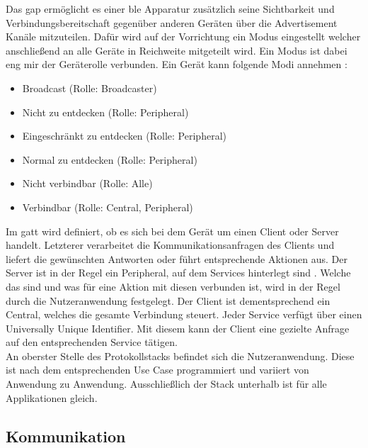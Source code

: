 \noindent Das \ac{gap} ermöglicht es einer \ac{ble} Apparatur zusätzlich seine Sichtbarkeit und Verbindungsbereitschaft gegenüber anderen Geräten über die Advertisement Kanäle mitzuteilen. Dafür wird auf der Vorrichtung ein Modus eingestellt welcher anschließend an alle Geräte in Reichweite mitgeteilt wird. Ein Modus ist dabei eng mir der Geräterolle verbunden. Ein Gerät kann folgende Modi annehmen \cite[Seite 35]{Townsend14:GSB}:
\begin{itemize}
	\setlength{\itemsep}{1pt}
	\item{Broadcast (Rolle: Broadcaster)}
	\item{Nicht zu entdecken (Rolle: Peripheral)}
	\item{Eingeschränkt zu entdecken (Rolle: Peripheral)}
	\item{Normal zu entdecken (Rolle: Peripheral)}
	\item{Nicht verbindbar (Rolle: Alle)}
	\item{Verbindbar (Rolle: Central, Peripheral)}
\end{itemize}   
\noindent Im \ac{gatt} wird definiert, ob es sich bei dem Gerät um einen Client oder Server handelt. Letzterer verarbeitet die Kommunikationsanfragen des Clients und liefert die gewünschten Antworten oder führt entsprechende Aktionen aus. Der Server ist in der Regel ein Peripheral, auf dem Services hinterlegt sind \cite[Seite 30]{Usama17:BBS}. Welche das sind und was für eine Aktion mit diesen verbunden ist, wird in der Regel durch die Nutzeranwendung festgelegt. Der Client ist dementsprechend ein Central, welches die gesamte Verbindung steuert. Jeder Service verfügt über einen Universally Unique Identifier. Mit diesem kann der Client eine gezielte Anfrage auf den entsprechenden Service tätigen.\\    
\noindent An oberster Stelle des Protokollstacks befindet sich die Nutzeranwendung. Diese ist nach dem entsprechenden Use Case programmiert und variiert von Anwendung zu Anwendung. Ausschließlich der Stack unterhalb ist für alle Applikationen gleich.\\

\subsection{Kommunikation}
\label{ss:funktionsweise:kommunkation}

